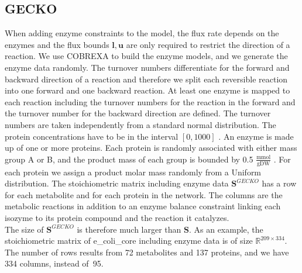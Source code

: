 \subsection{GECKO}
When adding enzyme constraints to the model, the flux rate depends on the enzymes and the flux bounds $\mathbf l, \mathbf u$ are only required to restrict the direction of a reaction.  
We use COBREXA to build the enzyme models, and we generate the enzyme data randomly.
The turnover numbers differentiate for the forward and backward direction of a reaction and therefore we split each reversible reaction into one forward and one backward reaction.
At least one enzyme is mapped to each reaction including the turnover numbers for the reaction in the forward and the turnover number for the backward direction are defined. 
The turnover numbers are taken independently from a standard normal distribution. %
The protein concentrations have to be in the interval $[0, 1000]$%
. An enzyme is made up of one or more proteins.
Each protein is randomly associated with either mass group A or B, and the product mass of each group is bounded by 0.5 $\frac{\text{mmol}}{\text{gDW}}$%
. For each protein we assign a product molar mass randomly from a Uniform distribution. 
The stoichiometric matrix including enzyme data $\mathbf S^{GECKO}$ has a row for each metabolite and for each protein in the network. The columns are the metabolic reactions in addition to an enzyme balance constraint linking each isozyme to its protein compound and the reaction it catalyzes. \\
The size of $\mathbf S^{GECKO}$ is therefore much larger than $\mathbf S$.
As an example, the stoichiometric matrix of \textsf{e\_coli\_core} including enzyme data is of size $\mathbb{R}^{209 \times 334}$. The number of rows results from 72 metabolites and 137 proteins, and we have 334 columns, instead of~95. 
